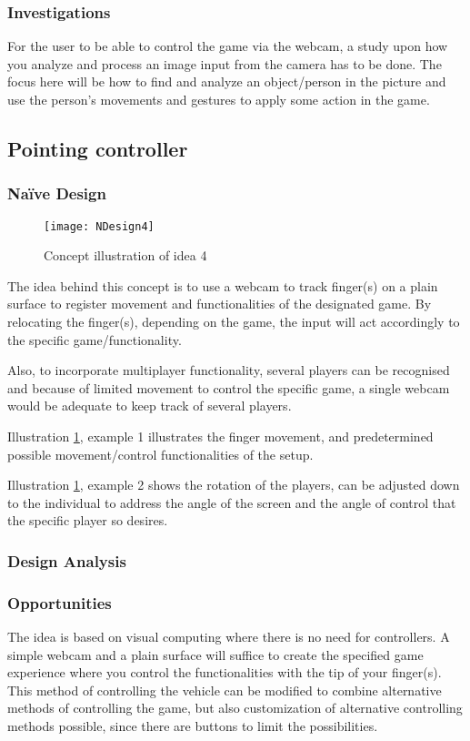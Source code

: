 \subsubsection*{Investigations}
For the user to be able to control the game via the webcam, a study upon how you analyze and process an image input from the camera has to be done. The focus here will be how to find and analyze an object/person in the picture and use the person’s movements and gestures to apply some action in the game.

\pagebreak

\subsection{Pointing controller} \label{nd4}
\subsubsection*{Naïve Design}
\begin{figure}[h]
\centering
\texttt{[image: NDesign4]}
\caption{Concept illustration of idea 4}
\label{fig:ndesign4}
\end{figure}

The idea behind this concept is to use a webcam to track finger(s) on a plain surface to register movement and functionalities of the designated game. By relocating the finger(s), depending on the game, the input will act accordingly to the specific game/functionality.

Also, to incorporate multiplayer functionality, several players can be recognised and because of limited movement to control the specific game, a single webcam would be adequate to keep track of several players.
\bigskip

Illustration \ref{fig:ndesign4}, example 1 illustrates the finger movement, and predetermined possible movement/control functionalities of the setup.

Illustration \ref{fig:ndesign4}, example 2 shows the rotation of the players, can be adjusted down to the individual to address the angle of the screen and the angle of control that the specific player so desires.


\subsubsection*{Design Analysis}
\subsubsection*{Opportunities}
The idea is based on visual computing where there is no need for controllers. A simple webcam and a plain surface will suffice to create the specified game experience where you control the functionalities with the tip of your finger(s). This method of controlling the vehicle can be modified to combine alternative methods of controlling the game, but also customization of alternative controlling methods possible, since there are buttons to limit the possibilities.

